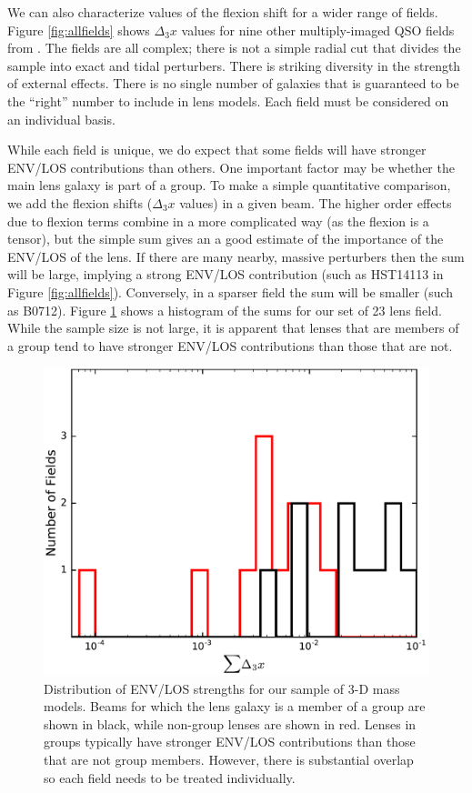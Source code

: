 \documentclass{emulateapj}
\begin{document}
We can also characterize values of the flexion shift for a wider range of fields.  Figure \ref{fig:allfields} shows $\Delta_3 x$ values for nine other multiply-imaged QSO fields from \citet{Wong11}.  The fields are all complex; there is not a simple radial cut that divides the sample into exact and tidal perturbers.  There is striking diversity in the strength of external effects.  There is no single number of galaxies that is guaranteed to be the ``right'' number to include in lens models.  Each field must be considered on an individual basis.

While each field is unique, we do expect that some fields will have stronger ENV/LOS contributions than others. One important factor may be whether the main lens galaxy is part of a group. To make a simple quantitative comparison, we add the flexion shifts ($\Delta_3 x$ values) in a given beam. The higher order effects due to flexion terms combine in a more complicated way (as the flexion is a tensor), but the simple sum gives an a good estimate of the importance of the ENV/LOS of the lens. If there are many nearby, massive perturbers then the sum will be large, implying a strong ENV/LOS contribution (such as HST14113 in Figure \ref{fig:allfields}). Conversely, in a sparser field the sum will be smaller (such as B0712). Figure \ref{fig:d3xsums} shows a histogram of the sums for our set of 23 lens field. While the sample size is not large, it is apparent that lenses that are members of a group tend to have stronger ENV/LOS contributions than those that are not.

\begin{figure}[!t]
\centering
\includegraphics[width=\columnwidth]{d3xsums.pdf}
\caption{Distribution of ENV/LOS strengths for our sample of 3-D mass models. Beams for which the lens galaxy is a member of a group are shown in black, while non-group lenses are shown in red. Lenses in groups typically have stronger ENV/LOS contributions than those that are not group members. However, there is substantial overlap so each field needs to be treated individually.}
\label{fig:d3xsums}
\end{figure}
\end{document}
